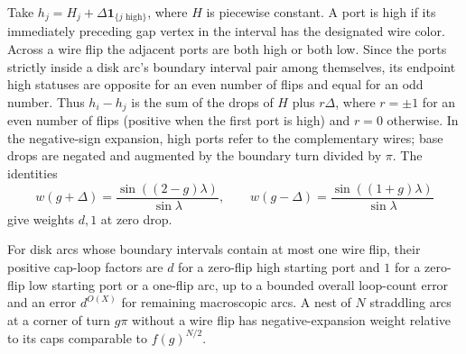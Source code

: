 Take $h_j=H_j+\Delta\mathbf1_{\{j\text{ high}\}}$, where $H$ is
piecewise constant. A port is high if its immediately preceding gap
vertex in the interval has the designated wire color. Across a wire
flip the adjacent ports are both high or both low. Since the ports
strictly inside a disk arc's boundary interval pair among themselves,
its endpoint high statuses are opposite for an even number of flips
and equal for an odd number. Thus
$h_i-h_j$ is the sum of the drops of $H$ plus $r\Delta$, where
$r=\pm1$ for an even number of flips (positive when the first port is
high) and $r=0$ otherwise. In the negative-sign expansion, high ports
refer to the complementary wires; base drops are negated and augmented
by the boundary turn divided by $\pi$. The identities
\begin{equation}\label{exp:staggered-weights}
 w(g+\Delta)=\frac{\sin((2-g)\lambda)}{\sin\lambda},
 \qquad
 w(g-\Delta)=\frac{\sin((1+g)\lambda)}{\sin\lambda}
\end{equation}
give weights $d,1$ at zero drop.

\begin{lemma}\label{exp:cap-elimination}
For disk arcs whose boundary intervals contain at most one wire flip,
their positive cap-loop factors are $d$ for a zero-flip high starting
port and $1$ for a zero-flip low starting port or a one-flip arc, up to
a bounded overall loop-count error and an error $d^{O(X)}$ for remaining
macroscopic arcs. A nest of $N$ straddling arcs at a corner of turn
$g\pi$ without a wire flip has negative-expansion weight relative to
its caps comparable to $f(g)^{N/2}$.
\end{lemma}

